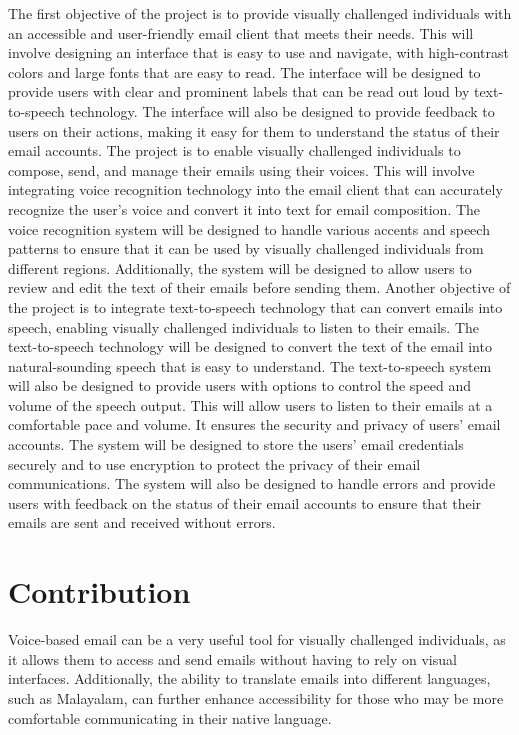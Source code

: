 \documentclass[12pt]{report}
\begin{document}
The first objective of the project is to provide visually challenged individuals with an accessible and user-friendly email client that meets their needs. This will involve designing an interface that is easy to use and navigate, with high-contrast colors and large fonts that are easy to read. The interface will be designed to provide users with clear and prominent labels that can be read out loud by text-to-speech technology. The interface will also be designed to provide feedback to users on their actions, making it easy for them to understand the status of their email accounts.\newline\newline
The project is to enable visually challenged individuals to compose, send, and manage their emails using their voices. This will involve integrating voice recognition technology into the email client that can accurately recognize the user's voice and convert it into text for email composition. The voice recognition system will be designed to handle various accents and speech patterns to ensure that it can be used by visually challenged individuals from different regions. Additionally, the system will be designed to allow users to review and edit the text of their emails before sending them.\newline\newline
Another objective of the project is to integrate text-to-speech technology that can convert emails into speech, enabling visually challenged individuals to listen to their emails. The text-to-speech technology will be designed to convert the text of the email into natural-sounding speech that is easy to understand. The text-to-speech system will also be designed to provide users with options to control the speed and volume of the speech output. This will allow users to listen to their emails at a comfortable pace and volume.\newline\newline
It ensures the security and privacy of users' email accounts. The system will be designed to store the users' email credentials securely and to use encryption to protect the privacy of their email communications. The system will also be designed to handle errors and provide users with feedback on the status of their email accounts to ensure that their emails are sent and received without errors.\newpage
\section{Contribution}
Voice-based email can be a very useful tool for visually challenged individuals, as it allows them to access and send emails without having to rely on visual interfaces. Additionally, the ability to translate emails into different languages, such as Malayalam, can further enhance accessibility for those who may be more comfortable communicating in their native language.
\end{document}
